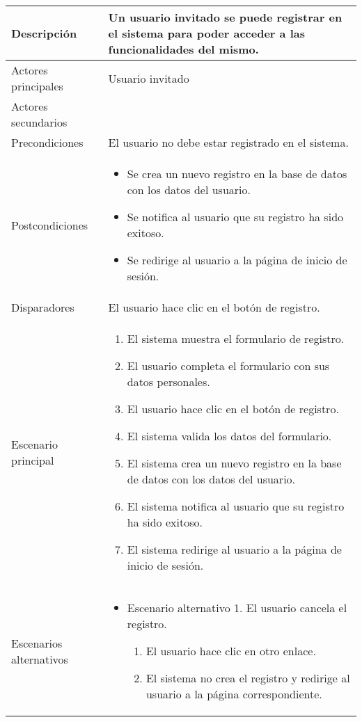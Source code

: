 \begin{longtable}{
    >{\columncolor{lightgreen!20}}p{4cm}
    p{12cm}
    }
    \midrule
    Descripción & Un usuario invitado se puede registrar en el sistema para poder acceder a las funcionalidades del mismo. \\
    \midrule
    Actores principales & Usuario invitado \\
    \midrule
    Actores secundarios &  \\
    \midrule
    Precondiciones & El usuario no debe estar registrado en el sistema. \\
    \midrule
    Postcondiciones & \begin{itemize}[nosep,leftmargin=*]
      \item Se crea un nuevo registro en la base de datos con los datos del usuario.
      \item Se notifica al usuario que su registro ha sido exitoso.
      \item Se redirige al usuario a la página de inicio de sesión.
    \end{itemize} \\
    \midrule
    Disparadores & El usuario hace clic en el botón de registro. \\
    \midrule
    Escenario principal & \begin{enumerate}[nosep,leftmargin=*]
      \item El sistema muestra el formulario de registro.
      \item El usuario completa el formulario con sus datos personales.
      \item El usuario hace clic en el botón de registro.
      \item El sistema valida los datos del formulario.
      \item El sistema crea un nuevo registro en la base de datos con los datos del usuario.
      \item El sistema notifica al usuario que su registro ha sido exitoso.
      \item El sistema redirige al usuario a la página de inicio de sesión.
    \end{enumerate} \\
    \midrule
    Escenarios alternativos & 
    \begin{itemize}[nosep,leftmargin=*]
      \item Escenario alternativo 1. El usuario cancela el registro.
      \begin{enumerate}[nosep,leftmargin=*]
          \item El usuario hace clic en otro enlace.
          \item El sistema no crea el registro y redirige al usuario a la página correspondiente.

\end{enumerate}
\end{itemize}
\end{longtable}
